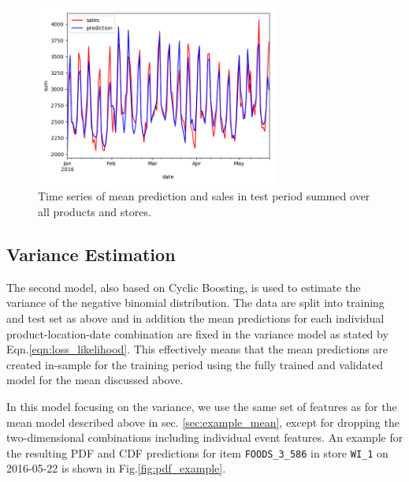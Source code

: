 \documentclass[BCOR=1mm, DIV=calc,10pt,
twoside=true,
twocolumn,
headings=normal]{scrartcl}
\newcommand{\fig}{Fig.}
\newcommand{\eqn}{Eqn.}
\begin{document}
\begin{figure}
\begin{center}
\includegraphics[width=8cm]{../figures/mean_prediction}
\caption{\label{fig:mean_prediction} Time series of mean prediction and sales in test period summed over all products and stores.}
\end{center}
\end{figure}

\subsection{Variance Estimation}

The second model, also based on Cyclic Boosting, is used to estimate the variance of the negative binomial distribution. The data are split into training and test set as above and in addition the mean predictions for each individual product-location-date combination are fixed in the variance model as stated by \eqn \eqref{eqn:loss_likelihood}. This effectively means that the mean predictions are created in-sample for the training period using the fully trained and validated model for the mean discussed above.

\noindent
In this model focusing on the variance, we use the same set of features as for the mean model described above in sec. \ref{sec:example_mean}, except for dropping the two-dimensional combinations including individual event features. An example for the resulting PDF and CDF predictions for item \texttt{FOODS\_3\_586} in store \texttt{WI\_1} on 2016-05-22 is shown in \fig \ref{fig:pdf_example}.
\end{document}
